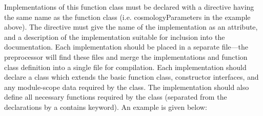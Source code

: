 Implementations of this function class must be declared with a directive having the same name as the function class (i.e. {\normalfont \ttfamily cosmologyParameters} in the example above). The directive must give the name of the implementation as an attribute, and a description of the implementation suitable for inclusion into the documentation. Each implementation should be placed in a separate file---the preprocessor will find these files and merge the implementations and function class definition into a single file for compilation. Each implementation should declare a class which extends the basic function class, constructor interfaces, and any module-scope data required by the class. The implementation should also define all necessary functions required by the class (separated from the declarations by a {\normalfont \ttfamily contains} keyword). An example is given below:

